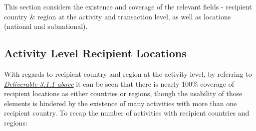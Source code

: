 \documentclass[letterpaper,10pt,english]{sphinxmanual}
\begin{document}
This section considers the existence and coverage of the relevant fields
- recipient country \& region at the activity and transaction level, as
well as locations (national and subnational).


\subsection{Activity Level Recipient Locations}
\label{\detokenize{Global Affairs Canada - Compliance Report:Activity-Level-Recipient-Locations}}
With regards to recipient country and region at the activity level, by
referring to {\hyperref[\detokenize{Global Affairs Canada - Compliance Report:Deliverable-3.1.1}]{\emph{Deliverable 3.1.1 above}}} it can be
seen that there is nearly 100\% coverage of recipient locations as either
countries or regions, though the usability of those elements is hindered
by the existence of many activities with more than one recipient
country. To recap the number of activities with recipient countries and
regions:
\end{document}
